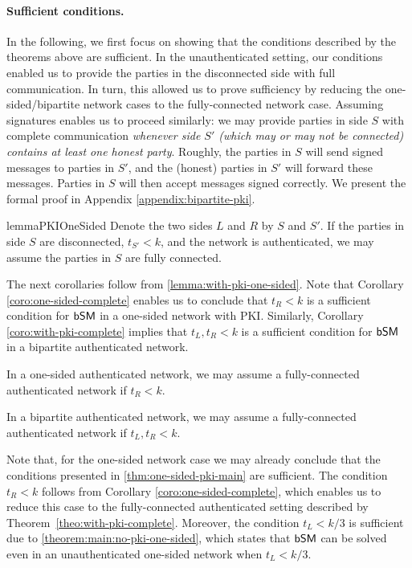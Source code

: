 \paragraph{Sufficient conditions.}
In the following, we first focus on showing that the conditions described by the theorems above are sufficient.
In the unauthenticated setting, our conditions enabled us to provide the parties in the disconnected side with full communication. In turn, this allowed us to prove sufficiency by reducing the one-sided/bipartite network cases to the fully-connected network case. Assuming signatures enables us to proceed similarly: we may provide parties in side $S$ with complete communication \emph{whenever side $S'$ (which may or may not be connected) contains at least one honest party}. Roughly, the parties in $S$ will send signed messages to parties in $S'$, and the (honest) parties in $S'$ will forward these messages. Parties in $S$ will then accept messages signed correctly. We present the formal proof in Appendix \ref{appendix:bipartite-pki}.

\begin{restatable}{lemma}{PKIOneSided}\label{lemma:with-pki-one-sided}
Denote the two sides $L$ and $R$ by $S$ and $S'$.
If the parties in side $S$ are disconnected, $t_{S'} < k$, and the network is authenticated, we may assume the parties in $S$ are fully connected. 
\end{restatable}

The next corollaries follow from \cref{lemma:with-pki-one-sided}. Note that Corollary \ref{coro:one-sided-complete} enables us to conclude that $t_R < k$ is a sufficient condition for $\textsf{bSM}$ in a one-sided network with PKI. Similarly, Corollary \ref{coro:with-pki-complete} implies that $t_L, t_R < k$ is a sufficient condition for $\textsf{bSM}$ in a bipartite authenticated network.
\begin{corollary}\label{coro:one-sided-complete}
In a one-sided authenticated network, we may assume a fully-connected authenticated network if $t_R < k$.
\end{corollary}

\begin{corollary}\label{coro:with-pki-complete}
In a bipartite authenticated network, we may assume a fully-connected authenticated network if $t_L, t_R < k$.
\end{corollary}
Note that, for the one-sided network case we may already conclude that the conditions presented in \cref{thm:one-sided-pki-main} are sufficient. The condition $t_R < k$ follows from Corollary \ref{coro:one-sided-complete}, which enables us to reduce this case to the fully-connected authenticated setting described by Theorem~\ref{theo:with-pki-complete}. Moreover, the condition $t_L < k / 3$ is sufficient due to \cref{theorem:main:no-pki-one-sided}, which states that  $\textsf{bSM}$ can be solved even in an unauthenticated one-sided network when $t_L < k / 3$.

